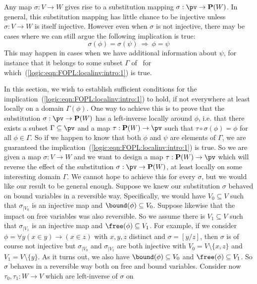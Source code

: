 Any map $\sigma:V\to W$ gives rise to a substitution mapping
$\sigma:\pv\to{\bf P}(W)$. In general, this substitution mapping has
little chance to be injective unless $\sigma:V\to W$ is itself
injective. However even when $\sigma$ is not injective, there may be
cases where we can still argue the following implication is true:
    \begin{equation}\label{logic:eqn:FOPL:localinv:intro:1}
    \sigma(\phi)=\sigma(\psi)\ \Rightarrow\ \phi=\psi
    \end{equation}
This may happen in cases when we have additional information about 
$\psi$, for instance that it belongs to some 
subset $\Gamma$ of \pv\ for which~(\ref{logic:eqn:FOPL:localinv:intro:1})
is true.

In this section, we wish to establish sufficient conditions for the
implication~(\ref{logic:eqn:FOPL:localinv:intro:1}) to hold, if not
everywhere at least locally on a domain $\Gamma(\phi)$. One way to
achieve this is to prove that the substitution $\sigma:\pv\to{\bf
P}(W)$ has a left-inverse locally around $\phi$, i.e. that there
exists a subset $\Gamma\subseteq\pv$ and a map $\tau:{\bf
P}(W)\to\pv$ such that $\tau\circ\sigma(\phi)=\phi$ for all
$\phi\in\Gamma$. So if we happen to know that both $\phi$ and $\psi$
are elements of $\Gamma$, we are guaranteed the
implication~(\ref{logic:eqn:FOPL:localinv:intro:1}) is true. So we
are given a map $\sigma:V\to W$ and we want to design a map
$\tau:{\bf P}(W)\to\pv$ which will reverse the effect of the
substitution $\sigma:\pv\to{\bf P}(W)$, at least locally on some
interesting domain $\Gamma$. We cannot hope to achieve this for
every $\sigma$, but we would like our result to be general enough.
Suppose we knew our substitution $\sigma$ behaved on bound variables
in a reversible way. Specifically, we would have $V_{0}\subseteq V$
such that $\sigma_{|V_{0}}$ is an injective map and
$\bound(\phi)\subseteq V_{0}$. Suppose likewise that the impact on
free variables was also reversible. So we assume there is
$V_{1}\subseteq V$ such that $\sigma_{|V_{1}}$ is an injective map
and $\free(\phi)\subseteq V_{1}$. For example, if we consider
$\phi=\forall y(x\in y)\to(x\in z)$ with $x,y,z$ distinct and
$\sigma=[y/z]$, then $\sigma$ is of course not injective but
$\sigma_{|V_{0}}$ and $\sigma_{|V_{1}}$ are both injective with
$V_{0}=V\setminus\{x,z\}$ and $V_{1}=V\setminus\{y\}$. As it turns
out, we also have $\bound(\phi)\subseteq V_{0}$ and
$\free(\phi)\subseteq V_{1}$. So $\sigma$ behaves in a reversible
way both on free and bound variables. Consider now
$\tau_{0},\tau_{1}:W\to V$ which are left-inverse of $\sigma$ on
